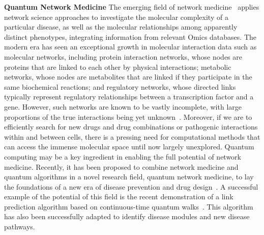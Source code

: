 \documentclass{article}
\begin{document}
\vspace{.25cm}
\noindent\textbf{Quantum Network Medicine} The emerging field of network medicine~\cite{Barabasi2011} applies network science approaches to investigate the molecular complexity of a particular disease, as well as the molecular relationships among apparently distinct phenotypes, integrating information from relevant Omics databases. The modern era has seen an exceptional growth in molecular interaction data such as molecular networks, including protein interaction networks, whose nodes are proteins that are linked to each other by physical interactions; metabolic networks, whose nodes are metabolites that are linked if they participate in the same biochemical reactions; and regulatory networks, whose directed links typically represent regulatory relationships between a transcription factor and a gene. However, such networks are known to be vastly incomplete, with large proportions of the true interactions being yet unknown~\cite{Luck2020}. Moreover, if we are to efficiently search for new drugs and drug combinations or pathogenic interactions within and between cells, there is a pressing need for computational methods that can access the immense molecular space until now largely unexplored. Quantum computing may be a key ingredient in enabling the full potential of network medicine. Recently, it has been proposed to combine network medicine and quantum algorithms in a novel research field, quantum network medicine, to lay the foundations of a new era of disease prevention and drug design~\cite{maniscalco2022quantum}. A successful example of the potential of this field is the recent demonstration of a link prediction algorithm based on continuous-time quantum walks~\cite{Goldsmith2023}. This algorithm has also been successfully adapted to identify disease modules and new disease pathways.

\FloatBarrier
\end{document}
